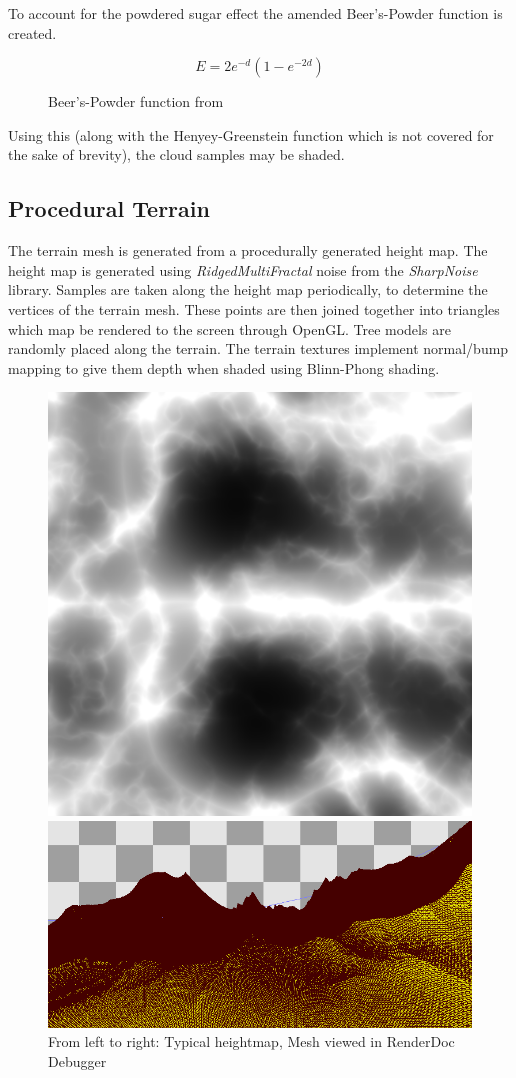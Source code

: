 \documentclass[10pt, openany]{book}
\begin{document}
To account for the powdered sugar effect the amended Beer's-Powder function is created.
\begin{figure}[H]
	\centering
	\[E = 2e^{-d}(1-e^{-2d})\]
	\caption[Beer's-Powder function]{Beer's-Powder function from \citep{gpupro7}}
\end{figure}

Using this (along with the Henyey-Greenstein function which is not covered for the sake of brevity), the cloud samples may be shaded.

\subsection{Procedural Terrain}

The terrain mesh is generated from a procedurally generated height map. The height map is generated using \textit{RidgedMultiFractal} noise from the \textit{SharpNoise} library. Samples are taken along the height map periodically, to determine the vertices of the terrain mesh. These points are then joined together into triangles which map be rendered to the screen through \Gls{OpenGL}. Tree models are randomly placed along the terrain. The terrain textures implement normal/bump mapping to give them depth when shaded using Blinn-Phong shading.

\begin{figure}[H]
	\centering
	\begin{minipage}{.35\textwidth}
		\centering
	  	\includegraphics[width=.6\linewidth]{ridged-noise}
	\end{minipage}%
	\begin{minipage}{.65\textwidth}
	  	\centering
	  	\includegraphics[width=.6\linewidth]{mesh}
	\end{minipage}
	\caption{From left to right: Typical heightmap, Mesh viewed in RenderDoc Debugger}
\end{figure}
\end{document}
